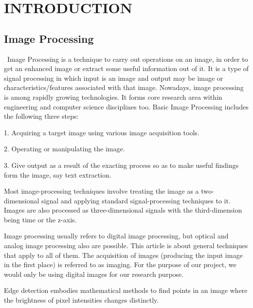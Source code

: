 \documentclass[BTech]{srmuthesis}
\begin{document}

\pagebreak
\clearpage



\chapter{INTRODUCTION}
\label{chap:intro}
\section{Image Processing}
 \ Image Processing\cite{into_image_processing_sisu} is a  technique to carry out operations on an image, in order to get an enhanced image or extract
some useful information out of it. It is a type of signal
processing in which input is an image and output may be
image or characteristics/features associated with that
image. Nowadays, image processing is among rapidly
growing technologies. It forms core research area within
engineering and computer science disciplines too. Basic
Image Processing includes the following three steps:

1. Acquiring a target image using various image
acquisition tools.

2. Operating or manipulating the image.

3. Give output as a result of the exacting process so as to
make useful findings form the image, say text
extraction.

Most image-processing techniques\cite{wiki_image_processing} involve treating the image as a two-dimensional signal and applying standard signal-processing techniques to it. Images are also processed as three-dimensional signals with the third-dimension being time or the z-axis.

Image processing usually refers to digital image processing, but optical and analog image processing also are possible. This article is about general techniques that apply to all of them. The acquisition of images (producing the input image in the first place) is referred to as imaging. For the purpose of our project, we would only be using digital images for our research purpose.

Edge detection embodies mathematical
methods to find points in an image where the
brightness of pixel intensities changes distinctly.
\end{document}

